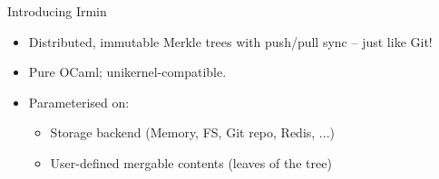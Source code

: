 \documentclass[aspectratio=1610]{beamer}
\begin{document}
\begin{frame}{Introducing Irmin}
  \begin{itemize}
  \item Distributed, immutable Merkle trees with push/pull sync -- just like Git!\vspace{2mm}
  \item Pure OCaml; unikernel-compatible.\vspace{2mm}
  \item Parameterised on:\vspace{1mm}
    \begin{itemize}
    \item Storage backend (Memory, FS, Git repo, Redis, ...)\vspace{1mm}
    \item User-defined mergable contents (leaves of the tree)
    \end{itemize}
  \end{itemize}



\end{frame}
\end{document}
